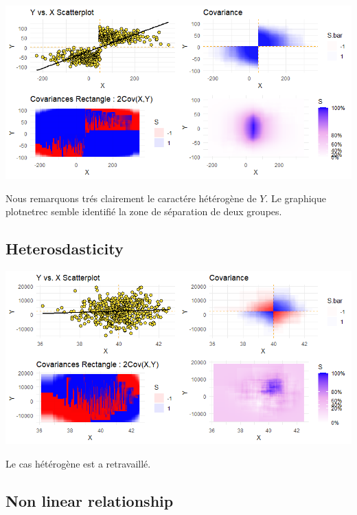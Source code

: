 \documentclass[
]{report}
\begin{document}
\begin{minipage}{0.45\textwidth}
    \includegraphics{plotnetrec_heterogeneity.png}
\end{minipage} 
\hspace{3.5ex}
\begin{minipage}{0.45\textwidth}
  Nous remarquons trés clairement le caractére hétérogène de $Y$. Le graphique plotnetrec semble identifié la zone de séparation de deux groupes. 
\end{minipage}

\hypertarget{heterosdasticity}{%
\subsection{Heterosdasticity}\label{heterosdasticity}}

\begin{minipage}{0.45\textwidth}
    \includegraphics{plotnetrec_heteroscedasticite.png}
\end{minipage} 
\hspace{3.5ex}
\begin{minipage}{0.45\textwidth}
  Le cas hétérogène est a retravaillé. 
\end{minipage}

\hypertarget{non-linear-relationship}{%
\subsection{Non linear relationship}\label{non-linear-relationship}}
\end{document}
